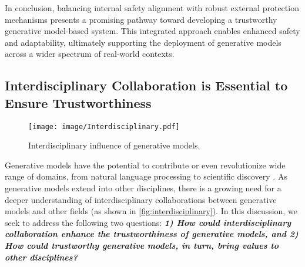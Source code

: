 In conclusion, balancing internal safety alignment with robust external protection mechanisms presents a promising pathway toward developing a trustworthy generative model-based system. This integrated approach enables enhanced safety and adaptability, ultimately supporting the deployment of generative models across a wider spectrum of real-world contexts.


\subsection{Interdisciplinary Collaboration is Essential to Ensure Trustworthiness}

\begin{figure}[h]
    \centering\vspace{+0.1in}
    \texttt{[image: image/Interdisciplinary.pdf]}
    \caption{Interdisciplinary influence of generative models.}
    \label{fig:interdisciplinary} \vspace{+0.15in}
\end{figure}

Generative models have the potential to contribute or even revolutionize wide range of domains, from natural language processing to scientific discovery \cite{colombo2024saullm, guo2024econnli, maatouk2024large, guo2023large, openai2024cooperation}. As generative models extend into other disciplines, there is a growing need for a deeper understanding of interdisciplinary collaborations between generative models and other fields (as shown in \autoref{fig:interdisciplinary}). In this discussion, we seek to address the following two questions: \textbf{\textit{1) How could interdisciplinary collaboration enhance the trustworthiness of generative models, and 2) How could trustworthy generative models, in turn, bring values to other disciplines?}}

